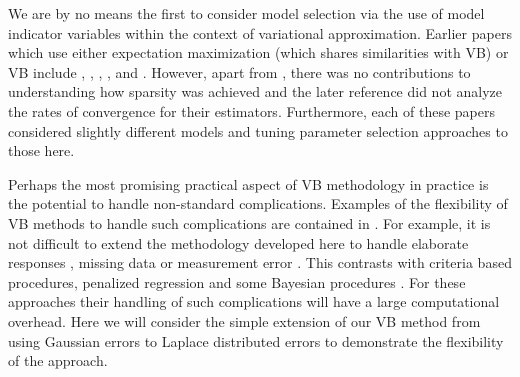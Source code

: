 \documentclass[11pt]{article}
\newtheorem{Main Result}{Main Result}
\newcommand{\joc}[1]{{\color{black}#1}}
\begin{document}
 
We are by no means the first to consider model selection via the use of model
indicator variables within the context of variational approximation. Earlier
papers which use either expectation maximization 
\joc{(which shares similarities with VB)} 
 or VB include \cite{Huang2007}, \cite{Rattray2009},
\cite{Logsdon2010}, \cite{Carbonetto2011}, \cite{wandormerod2011} and
\cite{Rockova2014}. However, apart from \cite{Rockova2014}, there
was no contributions to understanding 
how sparsity was achieved and the later reference
did not analyze the rates of convergence for their estimators.
Furthermore, each of these papers considered slightly different models and
tuning parameter selection approaches to those here.





Perhaps the most promising practical aspect of VB methodology in practice
is the potential to handle non-standard complications. Examples of the flexibility
of VB methods to handle such complications are contained in
\cite{LutsOrmerod2014}. For example, it is not difficult to extend the
methodology developed here to handle elaborate responses
\citep{WandEtal2011}, missing data \citep{FaesEtal2011} or measurement error
\citep{PhamEtal2013}. This contrasts with criteria based procedures, penalized
regression and some Bayesian procedures \citep[for example][where the models
are chosen carefully so that an exact expression for the marginal likelihood is
obtainable]{Liang2008,Maruyama2011}. For these approaches their handling of 
such  complications will have a large computational overhead. \joc{Here we will
consider the simple extension of our VB method from using Gaussian errors to 
Laplace distributed errors to demonstrate the flexibility of the approach.}
\end{document}
